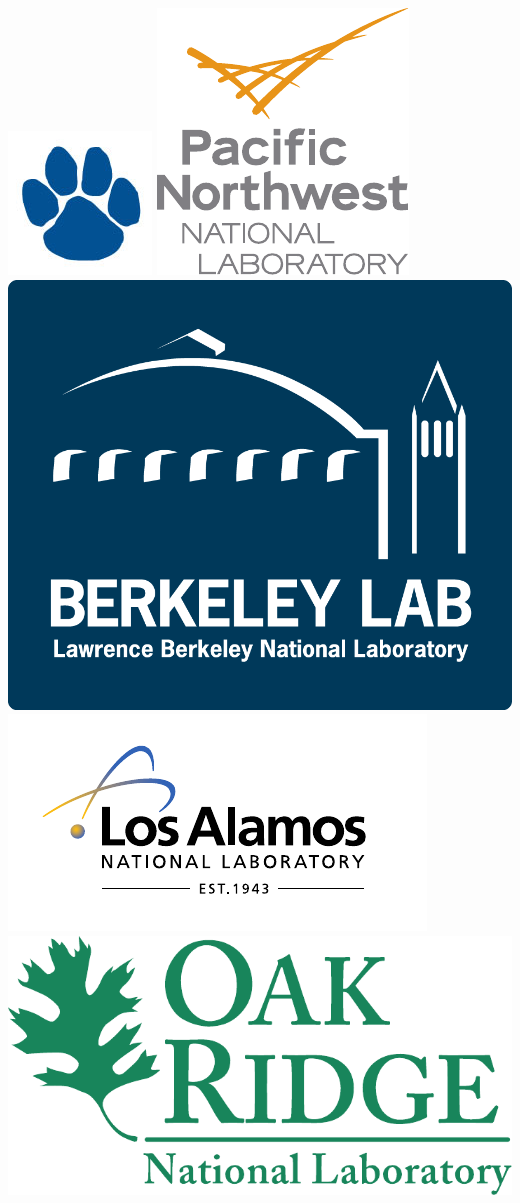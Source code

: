 \includegraphics[scale=0.35]{./logos/paw.jpg}
\includegraphics[scale=0.35]{./logos/PNNL_Color_Logo_Vertical}
\includegraphics[scale=0.35]{./logos/LBNL_Full_Logo_Final}
\includegraphics[scale=0.35]{./logos/lanl}
\includegraphics[scale=0.35]{./logos/ORNLlogo}

\dblline

